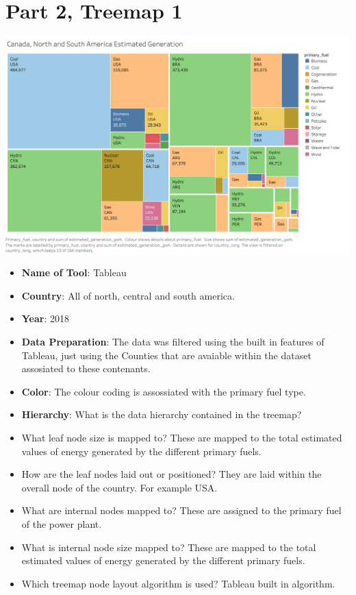 \hypertarget{part-2-treemap-1}{%
\section{Part 2, Treemap 1}\label{part-2-treemap-1}}

\begin{figure}

\end{figure}

\centering
\includegraphics[width=15cm]{AmericaEstGeneration}

\begin{itemize}
\tightlist
\item
  \textbf{Name of Tool}: Tableau
\item
  \textbf{Country}: All of north, central and south america.
\item
  \textbf{Year}: 2018
\item
  \textbf{Data Preparation}: The data was filtered using the built in features of Tableau, just using the Counties that are avaiable within the dataset assosiated to these contenants. 
\item
  \textbf{Color}: The colour coding is assossiated with the primary fuel type.
\item
  \textbf{Hierarchy}: What is the data hierarchy contained in the
  treemap?
\item
  What leaf node size is mapped to? These are mapped to the total estimated values of energy generated by the different primary fuels.
\item
  How are the leaf nodes laid out or positioned? They are laid within the overall node of the country. For example USA.
\item
  What are internal nodes mapped to? These are assigned to the primary fuel of the power plant.
\item
  What is internal node size mapped to? These are mapped to the total estimated values of energy generated by the different primary fuels.
\item
  Which treemap node layout algorithm is used?
  Tableau built in algorithm.
\end{itemize}
